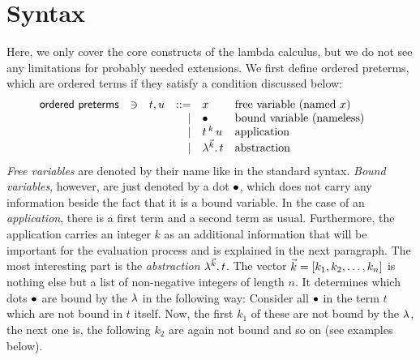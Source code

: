 \documentclass[submission,copyright,creativecommons]{eptcs}
\begin{document}
\section{Syntax}

Here, we only cover the core constructs of the lambda calculus, but we do not see any limitations for probably needed extensions. We first define ordered preterms, which are ordered terms if they satisfy a condition discussed below:
\[
\begin{array}{lllrll@{\qquad}}
\mathsf{ordered \ preterms}       & \ni & t,u & ::= & x & \mbox{free variable (named $x$)} \\
			                   &&& \mid & \ovar & \mbox{bound variable (nameless)} \\
			                   &&& \mid & \ApO t k u & \mbox{application} \\
			                   &&& \mid & \LaO {\vec k} t & \mbox{abstraction} \\
\end{array}
\]
\emph{Free variables} are denoted by their name like in the standard syntax. \emph{Bound variables}, however, are just denoted by a dot $\mathord{\bullet}$, which does not carry any information beside the fact that it is a bound variable. 
In the case of an \emph{application}, there is a first term and a second term as usual. 
Furthermore, the application carries an integer $k$ as an additional information that will be important for the evaluation process and is explained in the next paragraph.
The most interesting part is the \emph{abstraction} $\lambda ^{\vec k} . \, t$. The vector $\vec k = [k_1, k_2, \ldots, k_n]$ is nothing else but a list of non-negative  integers of length $n$. It determines which dots $\mathord{\bullet}$ are bound by the $\lambda$ in the following way: Consider all $\mathord{\bullet}$ in the term $t$ which are not bound in $t$ itself. Now, the first $k_1$ of these are not bound by the $\lambda$, the next one is, the following $k_2$ are again not bound and so on (see examples below). 
\end{document}
